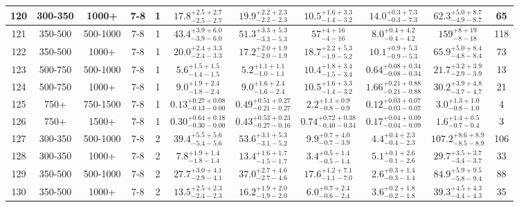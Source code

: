 \documentclass[11pt, oneside]{article}
\begin{document}
\begin{table}
{\begin{tabular}{ |c|c|c|c|c||c|c|c|c||c|c| }
120 & 300-350 & 1000+ & 7-8 & 1 & $17.8^{+2.5+2.7}_{-2.5-2.7}$ & $19.9^{+2.2+2.3}_{-2.2-2.3}$ & $10.5^{+1.6+3.3}_{-1.4-3.2}$ & $14.0^{+0.3+7.3}_{-0.3-7.3}$ & $62.3^{+5.0+8.7}_{-4.9-8.7}$ & 65 \\ \hline
121 & 350-500 & 500-1000 & 7-8 & 1 & $43.4^{+3.9+6.0}_{-3.9-6.0}$ & $51.3^{+3.3+5.3}_{-3.3-5.3}$ & $57^{+ 4+16}_{- 4-16}$ & $8.0^{+0.4+4.2}_{-0.4-4.2}$ & $159^{+ 8+19}_{- 8-18}$ & 118 \\ \hline
122 & 350-500 & 1000+ & 7-8 & 1 & $20.0^{+2.4+3.3}_{-2.4-3.3}$ & $17.2^{+2.0+1.9}_{-2.0-1.9}$ & $18.7^{+2.2+5.3}_{-1.9-5.2}$ & $10.1^{+0.9+5.3}_{-0.9-5.3}$ & $65.9^{+5.0+8.4}_{-4.8-8.4}$ & 73 \\ \hline
123 & 500-750 & 500-1000 & 7-8 & 1 & $5.6^{+1.5+1.5}_{-1.4-1.5}$ & $5.2^{+1.1+1.1}_{-1.0-1.1}$ & $10.4^{+1.8+3.4}_{-1.5-3.4}$ & $0.64^{+0.08+0.34}_{-0.08-0.34}$ & $21.7^{+3.2+3.9}_{-2.9-3.9}$ & 13 \\ \hline
124 & 500-750 & 1000+ & 7-8 & 1 & $9.0^{+1.9+2.4}_{-1.8-2.4}$ & $9.0^{+1.6+2.4}_{-1.6-2.4}$ & $10.5^{+1.6+3.3}_{-1.4-3.2}$ & $1.66^{+0.21+0.88}_{-0.21-0.88}$ & $30.2^{+3.9+4.8}_{-3.7-4.7}$ & 21 \\ \hline
125 & 750+ & 750-1500 & 7-8 & 1 & $0.13^{+0.27+0.08}_{-0.13-0.00}$ & $0.49^{+0.51+0.27}_{-0.21-0.27}$ & $2.2^{+1.1+0.9}_{-0.8-0.9}$ & $0.12^{+0.03+0.07}_{-0.03-0.07}$ & $3.0^{+1.3+1.0}_{-0.8-1.0}$ & 4 \\ \hline
126 & 750+ & 1500+ & 7-8 & 1 & $0.30^{+0.64+0.18}_{-0.30-0.00}$ & $0.43^{+0.53+0.23}_{-0.27-0.16}$ & $0.74^{+0.72+0.38}_{-0.40-0.34}$ & $0.17^{+0.04+0.09}_{-0.04-0.09}$ & $1.6^{+1.4+0.5}_{-0.7-0.4}$ & 3 \\ \hline
127 & 300-350 & 500-1000 & 7-8 & 2 & $39.4^{+5.5+5.6}_{-5.4-5.6}$ & $53.6^{+3.1+5.3}_{-3.1-5.2}$ & $9.9^{+0.7+4.0}_{-0.7-3.9}$ & $4.4^{+0.4+2.3}_{-0.4-2.3}$ & $107.2^{+8.6+8.9}_{-8.5-8.9}$ & 106 \\ \hline
128 & 300-350 & 1000+ & 7-8 & 2 & $7.8^{+1.9+1.4}_{-1.8-1.4}$ & $13.4^{+1.6+1.7}_{-1.5-1.7}$ & $3.4^{+0.5+1.4}_{-0.5-1.4}$ & $5.1^{+0.1+2.6}_{-0.1-2.6}$ & $29.7^{+3.5+3.7}_{-3.4-3.7}$ & 33 \\ \hline
129 & 350-500 & 500-1000 & 7-8 & 2 & $27.7^{+3.0+4.1}_{-2.9-4.1}$ & $37.0^{+2.7+4.6}_{-2.7-4.6}$ & $17.6^{+1.2+7.1}_{-1.1-7.0}$ & $2.6^{+0.3+1.4}_{-0.3-1.4}$ & $84.9^{+5.9+9.5}_{-5.8-9.4}$ & 88 \\ \hline
130 & 350-500 & 1000+ & 7-8 & 2 & $13.5^{+2.5+2.3}_{-2.4-2.3}$ & $16.2^{+1.9+2.0}_{-1.9-2.0}$ & $6.0^{+0.7+2.4}_{-0.6-2.4}$ & $3.6^{+0.2+1.8}_{-0.2-1.8}$ & $39.3^{+4.5+4.3}_{-4.4-4.3}$ & 35 \\ \hline

\end{tabular}}
\end{table}
\end{document}
